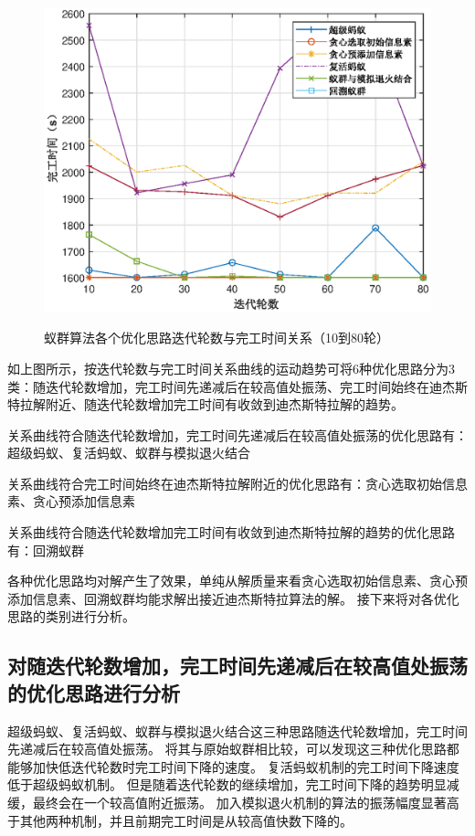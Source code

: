\begin{figure}[H]
	\centering
	\includegraphics[scale=1.00,angle=0]{figures/test1.eps}\\
	\caption{蚁群算法各个优化思路迭代轮数与完工时间关系（10到80轮）}
\end{figure}

如上图所示，按迭代轮数与完工时间关系曲线的运动趋势可将6种优化思路分为3类：随迭代轮数增加，完工时间先递减后在较高值处振荡、完工时间始终在迪杰斯特拉解附近、随迭代轮数增加完工时间有收敛到迪杰斯特拉解的趋势。

关系曲线符合随迭代轮数增加，完工时间先递减后在较高值处振荡的优化思路有：超级蚂蚁、复活蚂蚁、蚁群与模拟退火结合

关系曲线符合完工时间始终在迪杰斯特拉解附近的优化思路有：贪心选取初始信息素、贪心预添加信息素

关系曲线符合随迭代轮数增加完工时间有收敛到迪杰斯特拉解的趋势的优化思路有：回溯蚁群

各种优化思路均对解产生了效果，单纯从解质量来看贪心选取初始信息素、贪心预添加信息素、回溯蚁群均能求解出接近迪杰斯特拉算法的解。
接下来将对各优化思路的类别进行分析。

\subsection{对随迭代轮数增加，完工时间先递减后在较高值处振荡的优化思路进行分析}
超级蚂蚁、复活蚂蚁、蚁群与模拟退火结合这三种思路随迭代轮数增加，完工时间先递减后在较高值处振荡。
将其与原始蚁群相比较，可以发现这三种优化思路都能够加快低迭代轮数时完工时间下降的速度。
复活蚂蚁机制的完工时间下降速度低于超级蚂蚁机制。
但是随着迭代轮数的继续增加，完工时间下降的趋势明显减缓，最终会在一个较高值附近振荡。
加入模拟退火机制的算法的振荡幅度显著高于其他两种机制，并且前期完工时间是从较高值快数下降的。

